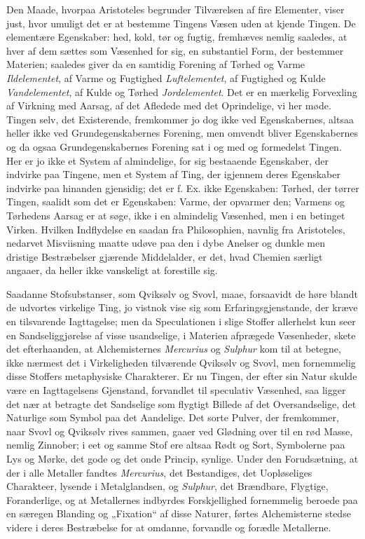 \documentclass[12pt,a4paper]{book}
\begin{document}
Den Maade, hvorpaa Aristoteles begrunder Tilværelsen
af fire Elementer, viser just, hvor umuligt det er at bestemme
Tingens Væsen uden at kjende Tingen. De elementære
Egenskaber: hed, kold, tør og fugtig, fremhæves nemlig
saaledes, at hver af dem sættes som Væsenhed for sig, en
substantiel Form, der bestemmer Materien; saaledes giver da
en samtidig Forening af Tørhed og Varme \emph{Ildelementet},
af Varme og Fugtighed \emph{Luftelementet}, af Fugtighed og
Kulde \emph{Vandelementet}, af Kulde og Tørhed
\emph{Jordelementet}. Det er en mærkelig Forvexling af
Virkning med Aarsag, af det Afledede med det Oprindelige, vi
her møde. Tingen selv, det Existerende, fremkommer jo dog
ikke ved Egenskabernes, altsaa heller ikke ved Grundegenskabernes
Forening, men omvendt bliver Egenskabernes og da ogsaa
Grundegenskabernes Forening sat i og med og formedelst Tingen.
Her er jo ikke et System af almindelige, for sig bestaaende
Egenskaber, der indvirke paa Tingene, men et System af
Ting, der igjennem deres Egenskaber indvirke paa hinanden
gjensidig; det er f. Ex. ikke Egenskaben: Tørhed, der tørrer
Tingen, saalidt som det er Egenskaben: Varme, der opvarmer
den; Varmens og Tørhedens Aarsag er at søge, ikke i en
almindelig Væsenhed, men i en betinget Virken. Hvilken
Indflydelse en saadan fra Philosophien, navnlig fra Aristoteles,
nedarvet Misviisning maatte udøve paa den i dybe Anelser
og dunkle men dristige Bestræbelser gjærende Middelalder, er
det, hvad Chemien særligt angaaer, da heller ikke vanskeligt
at forestille sig.

Saadanne Stofsubstanser, som Qviksølv og Svovl, maae,
forsaavidt de høre blandt de udvortes virkelige Ting, jo vistnok
vise sig som Erfaringsgjenstande, der kræve en tilsvarende
Iagttagelse; men da Speculationen i slige Stoffer allerhelst
kun seer en Sandseliggjørelse af visse usandselige, i Materien
afprægede Væsenheder, skete det efterhaanden, at Alchemisternes
\textit{Mercurius} og \textit{Sulphur} kom til at betegne, ikke nærmest det
i Virkeligheden tilværende Qviksølv og Svovl, men fornemmelig
disse Stoffers metaphysiske Charakterer. Er nu Tingen,
der efter sin Natur skulde være en Iagttagelsens Gjenstand,
forvandlet til speculativ Væsenhed, saa ligger det nær at betragte
det Sandselige som flygtigt Billede af det Oversandselige,
det Naturlige som Symbol paa det Aandelige. Det
sorte Pulver, der fremkommer, naar Svovl og Qviksølv rives
sammen, gaaer ved Glødning over til en rød Masse, nemlig
Zinnober; i eet og samme Stof ere altsaa Rødt og Sort,
Symbolerne paa Lys og Mørke, det gode og det onde Princip,
synlige. Under den Forudsætning, at der i alle Metaller
fandtes \textit{Mercurius}, det Bestandiges, det Uopløseliges
Charakteer, lysende i Metalglandsen, og \textit{Sulphur}, det
Brændbare, Flygtige, Foranderlige, og at Metallernes indbyrdes
Forskjellighed fornemmelig beroede paa en særegen Blanding og
„Fixation“ af disse Naturer, førtes Alchemisterne stedse videre
i deres Bestræbelse for at omdanne, forvandle og forædle
Metallerne.
\end{document}
